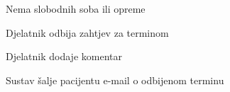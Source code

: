 \begin{packed_item}
\begin{packed_item}
\begin{packed_enum}
						\end{packed_enum}
						\item[4.a] Nema slobodnih soba ili opreme
						\item[] \begin{packed_enum}
							\item Djelatnik odbija zahtjev za terminom 
							\item Djelatnik dodaje komentar
							\item Sustav šalje pacijentu e-mail o odbijenom terminu
							
						\end{packed_enum}
					\end{packed_item}
				\end{packed_item}
				
				\noindent {}
